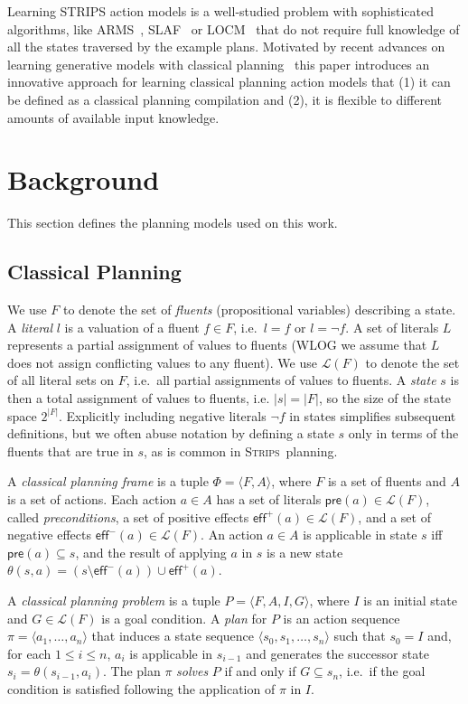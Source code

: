 \documentclass[letterpaper]{article} %
\newcommand{\tup}[1]{{\langle #1 \rangle}}
\newcommand{\pre}{\mathsf{pre}}     %
\newcommand{\eff}{\mathsf{eff}}     %
\newcommand{\strips}{\textsc{Strips}}     %
\begin{document}
Learning STRIPS action models is a well-studied problem with sophisticated algorithms, like {\sc ARMS}~\cite{yang2007learning}, {\sc SLAF}~\cite{amir:alearning:JAIR08} or {\sc LOCM}~\cite{cresswell2013acquiring} that do not require full knowledge of all the states traversed by the example plans. Motivated by recent advances on learning generative models with classical planning~\cite{bonet2009automatic,segovia2016hierarchical,segovia2017generating} this paper introduces an innovative approach for learning classical planning action models that (1) it can be defined as a classical planning compilation and (2), it is flexible to different amounts of available input knowledge.


\section{Background}
This section defines the planning models used on this work.

\subsection{Classical Planning}
We use $F$ to denote the set of {\em fluents} (propositional variables) describing a state. A {\em literal} $l$ is a valuation of a fluent $f\in F$, i.e.~$l=f$ or $l=\neg f$. A set of literals $L$ represents a partial assignment of values to fluents (WLOG we assume that $L$ does not assign conflicting values to any fluent). We use $\mathcal{L}(F)$ to denote the set of all literal sets on $F$, i.e.~all partial assignments of values to fluents. A {\em state} $s$ is then a total assignment of values to fluents, i.e. $|s|=|F|$, so the size of the state space $2^{|F|}$. Explicitly including negative literals $\neg f$ in states simplifies subsequent definitions, but we often abuse notation by defining a state $s$ only in terms of the fluents that are true in $s$, as is common in \strips\ planning.

A {\em classical planning frame} is a tuple $\Phi=\tup{F,A}$, where $F$ is a set of fluents and $A$ is a set of actions. Each action $a\in A$ has a set of literals $\pre(a)\in\mathcal{L}(F)$, called {\em preconditions}, a set of positive effects $\eff^+(a)\in\mathcal{L}(F)$, and a set of negative effects $\eff^-(a)\in\mathcal{L}(F)$. An action $a\in A$ is applicable in state $s$ iff $\pre(a)\subseteq s$, and the result of applying $a$ in $s$ is a new state $\theta(s,a)=(s\setminus \eff^-(a))\cup\eff^+(a)$.

A {\em classical planning problem} is a tuple $P=\tup{F,A,I,G}$, where $I$ is an initial state and $G\in\mathcal{L}(F)$ is a goal condition. A {\em plan} for $P$ is an action sequence $\pi=\tup{a_1, \ldots, a_n}$ that induces a state sequence $\tup{s_0, s_1, \ldots, s_n}$ such that $s_0=I$ and, for each {\small $1\leq i\leq n$}, $a_i$ is applicable in $s_{i-1}$ and generates the successor state $s_i=\theta(s_{i-1},a_i)$. The plan $\pi$ {\em solves} $P$ if and only if $G\subseteq s_n$, i.e.~if the goal condition is satisfied following the application of $\pi$ in $I$.
\end{document}
